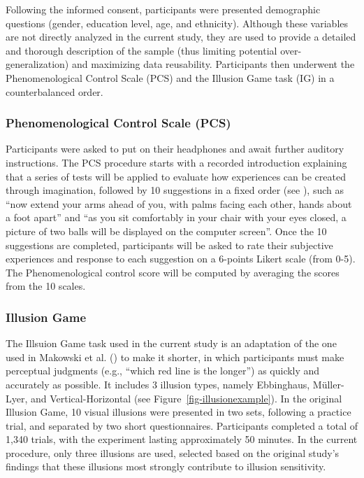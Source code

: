\documentclass[
  man,
  floatsintext,
  longtable,
  nolmodern,
  notxfonts,
  notimes,
  colorlinks=true,linkcolor=blue,citecolor=blue,urlcolor=blue]{apa7}
\begin{document}
Following the informed consent, participants were presented demographic
questions (gender, education level, age, and ethnicity). Although these
variables are not directly analyzed in the current study, they are used
to provide a detailed and thorough description of the sample (thus
limiting potential over-generalization) and maximizing data reusability.
Participants then underwent the Phenomenological Control Scale (PCS) and
the Illusion Game task (IG) in a counterbalanced order.

\subsubsection{Phenomenological Control Scale
(PCS)}\label{phenomenological-control-scale-pcs}

Participants were asked to put on their headphones and await further
auditory instructions. The PCS procedure starts with a recorded
introduction explaining that a series of tests will be applied to
evaluate how experiences can be created through imagination, followed by
10 suggestions in a fixed order (see ), such as ``now extend your arms ahead of you, with palms
facing each other, hands about a foot apart'' and ``as you sit
comfortably in your chair with your eyes closed, a picture of two balls
will be displayed on the computer screen''. Once the 10 suggestions are
completed, participants will be asked to rate their subjective
experiences and response to each suggestion on a 6-points Likert scale
(from 0-5). The Phenomenological control score will be computed by
averaging the scores from the 10 scales.

\subsubsection{Illusion Game}\label{illusion-game}

The Illsuion Game task used in the current study is an adaptation of the
one used in Makowski et al. () to make
it shorter, in which participants must make perceptual judgments (e.g.,
``which red line is the longer'') as quickly and accurately as possible.
It includes 3 illusion types, namely Ebbinghaus, Müller-Lyer, and
Vertical-Horizontal (see Figure~\ref{fig-illusionexample}). In the
original Illusion Game, 10 visual illusions were presented in two sets,
following a practice trial, and separated by two short questionnaires.
Participants completed a total of 1,340 trials, with the experiment
lasting approximately 50 minutes. In the current procedure, only three
illusions are used, selected based on the original study's findings that
these illusions most strongly contribute to illusion sensitivity.
\end{document}

